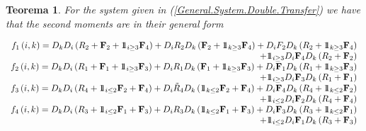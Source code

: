 \documentclass{article}
\newtheorem{Teo}{Teorema}
\newcommand{\indora}{\mbox{$1$\hspace{-0.8ex}$1$}}
\begin{document}
\begin{Teo}
For the system given in (\ref{General.System.Double.Transfer}) we have that the second moments are in their general form

\begin{eqnarray}\label{Eq.Gral.Second.Order.Exhaustive}
\begin{array}{r}
f_{1}\left(i,k\right)=D_{k}D_{i}\left(R_{2}+\mathbf{F}_{2}+\indora_{i\geq3}\mathbf{F}_{4}\right)
+D_{i}R_{2}D_{k}\left(\mathbf{F}_{2}+\indora_{k\geq3}\mathbf{F}_{4}\right)
+D_{i}F_{2}D_{k}\left(R_{2}+\indora_{k\geq3}\mathbf{F}_{4}\right)\\
+\indora_{i\geq3}D_{i}\mathbf{F}_{4}D_{k}\left(R_{2}+\mathbf{F}_{2}\right)\\
f_{2}\left(i,k\right)=D_{k}D_{i}\left(R_{1}+\mathbf{F}_{1}+\indora_{i\geq3}\mathbf{F}_{3}\right)+D_{i}R_{1}D_{k}\left(\mathbf{F}_{1}+\indora_{k\geq3}\mathbf{F}_{3}\right)+D_{i}\mathbf{F}_{1}D_{k}\left(R_{1}+\indora_{k\geq3}\mathbf{F}_{3}\right)\\
+\indora_{i\geq3}D_{i}\mathbf{F}_{3}D_{k}\left(R_{1}+\mathbf{F}_{1}\right)\\
f_{3}\left(i,k\right)=D_{k}D_{i}\left(R_{4}+\indora_{i\leq2}\mathbf{F}_{2}+\mathbf{F}_{4}\right)+D_{i}\tilde{R}_{4}D_{k}\left(\indora_{k\leq2}\mathbf{F}_{2}+\mathbf{F}_{4}\right)+D_{i}\mathbf{F}_{4}D_{k}\left(R_{4}+\indora_{k\leq2}\mathbf{F}_{2}\right)\\
+\indora_{i\leq2}D_{i}\mathbf{F}_{2}D_{k}\left(R_{4}+\mathbf{F}_{4}\right)\\
f_{4}\left(i,k\right)=D_{k}D_{i}\left(R_{3}+\indora_{i\leq2}\mathbf{F}_{1}+\mathbf{F}_{3}\right)+D_{i}R_{3}D_{k}\left(\indora_{k\leq2}\mathbf{F}_{1}+\mathbf{F}_{3}\right)+D_{i}\mathbf{F}_{3}D_{k}\left(R_{3}+\indora_{k\leq2}\mathbf{F}_{1}\right)\\
+\indora_{i\leq2}D_{i}\mathbf{F}_{1}D_{k}\left(R_{3}+\mathbf{F}_{3}\right)
\end{array}
\end{eqnarray}%

\end{Teo}
\end{document}
